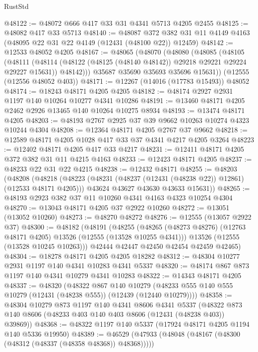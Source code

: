 \begin{lexlean}{RustStd}
\begin{coremodule}
@48122 := @48072 @666 @417 @33 @31 @4341 @5713 @4205 @2455
@48125 := @48082 @417 @33 @5713
@48140 := @48087
    @372
    @382
    @31
    @11
    @4149
    @4163
    (@48095 @22 @31 @22 @4149 (@12431 (@48100 @22)) @12459)
@48142 := @12533 @48052 @4205
@48167 := @48065
    (@48070
      (@48080
        (@48085
          (@48105
            (@48111
              (@48114 (@48122 (@48125 (@48140 @48142)) @29218 @29221 @29224 @29227 @15631))
              @48142)))
        @35687
        @35690
        @35693
        @35696
        @15631))
    (@12555 (@12556 @48052 @403))
@48171 := @12267 (@14016 (@17783 @15493)) @48052
@48174 := @18243 @48171 @4205 @4205
@48182 := @48174 @2927 @2931 @1197 @140 @10264 @10277 @4341 @10286
@48191 := @13460 @48171 @4205 @2462 @2926 @13465 @140 @10264 @10275 @8934
@48193 := @13474 @48171 @4205
@48203 := @48193 @2767 @2925 @37 @39 @9662 @10263 @10274 @4323 @10244 @4304
@48208 := @12364 @48171 @4205 @2767 @37 @9662
@48218 := @12589 @48171 @4205 @1028 @417 @33 @37 @4341 @4217 @4205 @3264
@48223 := @12402 @48171 @4205 @417 @33 @4217
@48231 := @12411 @48171 @4205 @372 @382 @31 @11 @4215 @4163
@48233 := @12423 @48171 @4205
@48237 := @48233 @22 @31 @22 @4215
@48238 := @12432 @48171
@48255 := @48203
    (@48208
      (@48218
        (@48223 (@48231 (@48237 (@12431 (@48238 @22)) @12861) (@12533 @48171 @4205)))
        @43624
        @43627
        @43630
        @43633
        @15631))
@48265 := @48193 @2923 @382 @37 @11 @10260 @4341 @4163 @4323 @10254 @4304
@48270 := @13043 @48171 @4205 @37 @2922 @10260
@48272 := @13051 (@13052 @10260)
@48273 := @48270 @48272
@48276 := @12555 (@13057 @2922 @37)
@48300 := @48182
    (@48191
      (@48255
        (@48265 (@48273 @48276) (@12763 @48171 @4205) @13526 (@12555 (@13528 @10255 @4341)))
        @13526
        (@12555 (@13528 @10245 @10263)))
      @42444
      @42447
      @42450
      @42454
      @42459
      @42465)
@48304 := @18278 @48171 @4205 @4205 @18282
@48312 := @48304 @10277 @2931 @1197 @140 @4341 @10283 @4341 @5337
@48320 := @48174 @867 @873 @1197 @140 @4341 @10279 @4341 @10283
@48322 := @14343 @48171 @4205
@48337 := @48320
    (@48322
      @867
      @140
      @10279
      (@48233 @555 @140 @555 @10279 (@12431 (@48238 @555)) (@12439 (@12440 @10279))))
@48358 := @48304
    @10279
    @873
    @1197
    @140
    @4341
    @8606
    @4341
    @5337
    (@48322 @873 @140 @8606 (@48233 @403 @140 @403 @8606 (@12431 (@48238 @403)) @39869))
@48368 := @48322 @1197 @140 @5337 (@17924 @48171 @4205 @1194 @140 @5336 @19950)
@48389 := @46529
    (@47933 (@48048 (@48167 (@48300 (@48312 (@48337 (@48358 @48368)) @48368)))))

\end{coremodule}
\end{lexlean}
